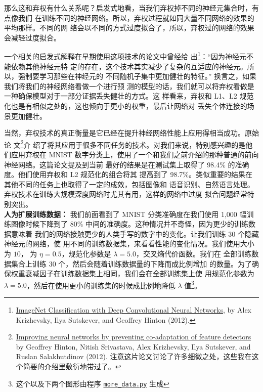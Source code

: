 那么这和弃权有什么关系呢？启发式地看，当我们弃权掉不同的神经元集合时，有点像我们
在训练不同的神经网络。所以，弃权过程就如同大量不同网络的效果的平均那样。不同的网
络会以不同的方式过度拟合了，所以，弃权过的网络的效果会减轻过度拟合。

一个相关的启发式解释在早期使用这项技术的论文中曾经给
出\footnote{\href{https://papers.nips.cc/paper/4824-imagenet-classification-with-deep-convolutional-neural-networks.pdf}{ImageNet
    Classification with Deep Convolutional Neural Networks}, by Alex Krizhevsky,
  Ilya Sutskever, and Geoffrey Hinton (2012).}：``因为神经元不能依赖其他神经元特
定的存在，这个技术其实减少了复杂的互适应的神经元。所以，强制要学习那些在神经元的
不同随机子集中更加健壮的特征。'' 换言之，如果我们将我们的神经网络看做一个进行预
测的模型的话，我们就可以将弃权看做是一种确保模型对于一部分证据丢失健壮的方式。这
样看来，弃权和 L1、L2 规范化也是有相似之处的，这也倾向于更小的权重，最后让网络对
丢失个体连接的场景更加健壮。

当然，弃权技术的真正衡量是它已经在提升神经网络性能上应用得相当成功。原始论
文\footnote{\href{http://arxiv.org/pdf/1207.0580.pdf}{Improving neural networks
    by preventing co-adaptation of feature detectors} by Geoffrey Hinton, Nitish
  Srivastava, Alex Krizhevsky, Ilya Sutskever, and Ruslan Salakhutdinov
  (2012). 注意这片论文讨论了许多细微之处，这些我在这个简要的介绍里敷衍地带过了。}介
绍了将其应用于很多不同任务的技术。对我们来说，特别感兴趣的是他们应用弃权在 MNIST
数字分类上，使用了一个和我们之前介绍的那种普通的前向神经网络。这篇论文提及到当前
最好的结果是在测试集上取得了 98.4\% 的准确度。他们使用弃权和 L2 规范化的组合将其
提高到了 98.7\%。类似重要的结果在其他不同的任务上也取得了一定的成效，包括图像和
语音识别、自然语言处理。弃权技术在训练大规模深度网络时尤其有用，这样的网络中过度
拟合问题经常特别突出。\\

\textbf{人为扩展训练数据：} 我们前面看到了 MNIST 分类准确度在我们使用 1,000 幅训
练图像时候下降到了 80\% 中间的准确度。这种情况并不奇怪，因为更少的训练数据意味着
我们的网络接触更少的人类手写的数字中的变化。让我们训练 30 个隐藏神经元的网络，使
用不同的训练数据集，来看看性能的变化情况。我们使用\minibatch{}大小为 $10$，
\learningrate{}为 $\eta=0.5$，规范化参数是 $\lambda=5.0$，交叉熵代价函数。我们在
全部训练数据集合上训练 30 个\epochs{}，然后会随着训练数据量的下降而成比例增加
\epochs{}的数量。为了确保权重衰减因子在训练数据集上相同，我们会在全部训练集上使
用规范化参数为 $\lambda = 5.0$，然后在使用更小的训练集的时候成比例地降低
$\lambda$ 值\footnote{这个以及下两个图形由程序  \href{https://github.com/mnielsen/neural-networks-and-deep-learning/blob/master/fig/more_data.py}{\lstinline!more_data.py!}
  生成}。

